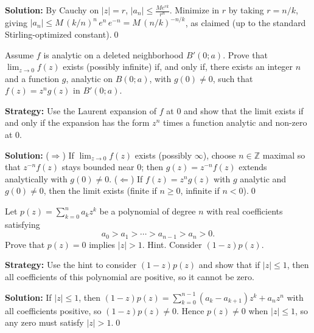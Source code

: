 \bigskip\noindent\textbf{Solution:}
By Cauchy on $|z|=r$, $|a_n|\le \frac{M e^{r k}}{r^n}$. Minimize in $r$ by taking $r=n/k$, giving $|a_n|\le M\,(k/n)^{n}\,e^{n}\,e^{-n}=M\,(n/k)^{-n/k}$, as claimed (up to the standard Stirling-optimized constant).\qed


\begin{problembox}
\begin{problemstatement}
Assume \( f \) is analytic on a deleted neighborhood \( B'(0; a) \). Prove that \( \lim_{z \to 0} f(z) \) exists (possibly infinite) if, and only if, there exists an integer \( n \) and a function \( g \), analytic on \( B(0; a) \), with \( g(0) \neq 0 \), such that \( f(z) = z^n g(z) \) in \( B'(0; a) \).
\end{problemstatement}
\end{problembox}

\noindent\textbf{Strategy:} Use the Laurent expansion of \( f \) at \( 0 \) and show that the limit exists if and only if the expansion has the form \( z^n \) times a function analytic and non-zero at \( 0 \).

\bigskip\noindent\textbf{Solution:}
($\Rightarrow$) If $\lim_{z\to0}f(z)$ exists (possibly $\infty$), choose $n\in\mathbb Z$ maximal so that $z^{-n}f(z)$ stays bounded near $0$; then $g(z)=z^{-n}f(z)$ extends analytically with $g(0)\ne0$.
($\Leftarrow$) If $f(z)=z^n g(z)$ with $g$ analytic and $g(0)\ne0$, then the limit exists (finite if $n\ge0$, infinite if $n<0$).\qed


\begin{problembox}
\begin{problemstatement}
Let \( p(z) = \sum_{k=0}^n a_k z^k \) be a polynomial of degree \( n \) with real coefficients satisfying
\[a_0 > a_1 > \cdots > a_{n-1} > a_n > 0.\]
Prove that \( p(z) = 0 \) implies \( |z| > 1 \). Hint. Consider \( (1 - z)p(z) \).
\end{problemstatement}
\end{problembox}

\noindent\textbf{Strategy:} Use the hint to consider \( (1-z)p(z) \) and show that if \( |z| \leq 1 \), then all coefficients of this polynomial are positive, so it cannot be zero.

\bigskip\noindent\textbf{Solution:}
If $|z|\le1$, then $(1-z)p(z)=\sum_{k=0}^{n-1}(a_k-a_{k+1})z^k+a_n z^n$ with all coefficients positive, so $(1-z)p(z)\ne0$. Hence $p(z)\ne0$ when $|z|\le1$, so any zero must satisfy $|z|>1$.\qed


